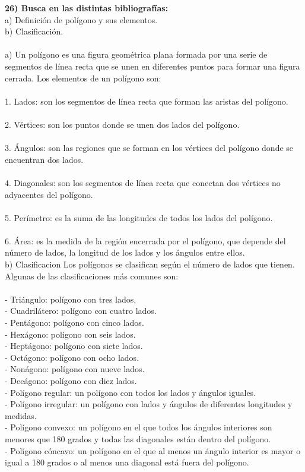 \documentclass{article}
\begin{document}
{\bf 26) Busca en las distintas bibliografías: }\\
a) Definición de polígono y sus elementos.\\
b) Clasificación.\\
\\
a) Un polígono es una figura geométrica plana formada por una serie de segmentos de línea recta que se unen en diferentes puntos para formar una figura cerrada. Los elementos de un polígono son:\\
\\
1. Lados: son los segmentos de línea recta que forman las aristas del polígono.\\
\\
2. Vértices: son los puntos donde se unen dos lados del polígono.\\
\\
3. Ángulos: son las regiones que se forman en los vértices del polígono donde se encuentran dos lados.\\
\\
4. Diagonales: son los segmentos de línea recta que conectan dos vértices no adyacentes del polígono.\\
\\
5. Perímetro: es la suma de las longitudes de todos los lados del polígono.\\
\\
6. Área: es la medida de la región encerrada por el polígono, que depende del número de lados, la longitud de los lados y los ángulos entre ellos.\\

b) Clasificacion
Los polígonos se clasifican según el número de lados que tienen. Algunas de las clasificaciones más comunes son:\\
\\
- Triángulo: polígono con tres lados.\\
- Cuadrilátero: polígono con cuatro lados.\\
- Pentágono: polígono con cinco lados.\\
- Hexágono: polígono con seis lados.\\
- Heptágono: polígono con siete lados.\\
- Octágono: polígono con ocho lados.\\
- Nonágono: polígono con nueve lados.\\
- Decágono: polígono con diez lados.\\
- Polígono regular: un polígono con todos los lados y ángulos iguales.\\
- Polígono irregular: un polígono con lados y ángulos de diferentes longitudes y medidas.\\
- Polígono convexo: un polígono en el que todos los ángulos interiores son menores que 180 grados y todas las diagonales están dentro del polígono.\\
- Polígono cóncavo: un polígono en el que al menos un ángulo interior es mayor o igual a 180 grados o al menos una diagonal está fuera del polígono.\\
\\
\end{document}
